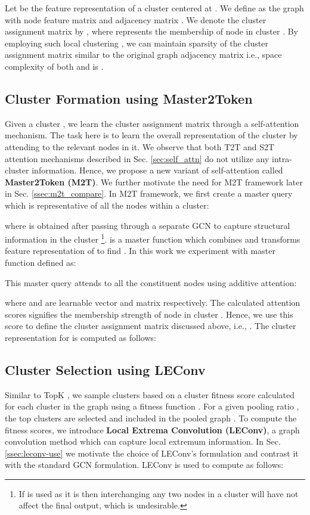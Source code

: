\documentclass[letterpaper]{article} \usepackage{aaai20}  \usepackage{times}  \usepackage{helvet} \usepackage{courier}  \usepackage[hyphens]{url}  \usepackage{graphicx} \urlstyle{rm} \def\UrlFont{\rm}  \usepackage{graphicx}  \frenchspacing  \setlength{\pdfpagewidth}{8.5in}  \setlength{\pdfpageheight}{11in}
\begin{document}
\noindent Let  be the feature representation of a cluster  centered at . We define  as the graph with node feature matrix  and adjacency matrix . We denote the cluster assignment matrix by , where  represents the membership of node  in cluster . By employing such local clustering \cite{satu}, we can maintain sparsity of the cluster assignment matrix  similar to the original graph adjacency matrix  i.e., space complexity of both  and  is .

\subsection{Cluster Formation using Master2Token}
\label{ssec:node-aggregation}
Given a cluster , we learn the cluster assignment matrix  through a self-attention mechanism. The task here is to learn the overall representation of the cluster  by attending to the relevant nodes in it.  We observe that both T2T and S2T attention mechanisms described in Sec. \ref{sec:self_attn} do not utilize any intra-cluster information. Hence, we propose a new variant of self-attention called \textbf{Master2Token (M2T)}. We further motivate the need for M2T framework later in Sec. \ref{ssec:m2t_compare}. In M2T framework, we first create a master query  which is representative of all the nodes within a cluster:

where  is obtained after passing  through a separate GCN to capture structural information in the cluster  \footnote{If  is used as it is then interchanging any two nodes in a cluster will have not affect the final output, which is undesirable.}.  is a master function which combines and transforms feature representation of  to find . In this work we experiment with  master function defined as:


This master query  attends to all the constituent nodes  using additive attention:



where  and  are learnable vector and matrix respectively. The calculated attention scores  signifies the membership strength of node  in cluster . Hence, we use this score to define the cluster assignment matrix discussed above, i.e., . The cluster representation  for  is computed as follows:



\subsection{Cluster Selection using LEConv}
\label{ssec:cluster-selection}
Similar to TopK \cite{topk}, we sample clusters based on a cluster fitness score  calculated for each cluster in the graph  using a fitness function . For a given pooling ratio , the top  clusters are selected and included in the pooled graph . To compute the fitness scores, we introduce \textbf{Local Extrema Convolution (LEConv)}, a graph convolution method which can capture local extremum information. In Sec. \ref{ssec:leconv-use} we motivate the choice of LEConv's formulation and contrast it with the standard GCN formulation. LEConv is used to compute  as follows:
\end{document}
